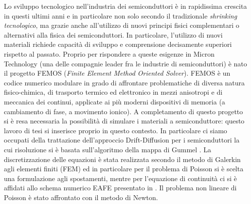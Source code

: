 %
%
%
%
%

Lo sviluppo tecnologico nell'industria dei semiconduttori \`e in rapidissima crescita in questi ultimi anni e in particolare non solo secondo il tradizionale \textit{shrinking tecnologico}, ma grazie anche all'utilizzo di nuovi principi fisici complementari o alternativi alla fisica dei semiconduttori.
In particolare, l'utilizzo di nuovi materiali richiede capacit\`a di sviluppo e comprensione decisamente superiori rispetto al passato. Proprio per rispondere a queste esigenze in Micron Technology (una delle compagnie leader fra le industrie di semiconduttori) \`e nato il progetto FEMOS (\textit{Finite Element Method Oriented Solver}). FEMOS \`e un codice numerico modulare in grado di affrontare problematiche di diversa natura fisico-chimica,  di trasporto termico ed elettronico in mezzi anisotropi e di meccanica dei continui, applicate ai pi\`u moderni dispositivi di memoria (a cambiamento di fase, a movimento ionico).
A completamento di questo progetto si \`e resa necessaria la possibilit\`a di simulare i materiali a semiconduttore: questo lavoro di tesi si inserisce proprio in questo contesto. 
In particolare ci siamo occupati della trattazione dell'approccio Drift-Diffusion \cite{Jackson:ElettroClassica} per i semiconduttori la cui risoluzione si \`e basata sull'algoritmo della mappa di Gummel \cite{GummelMap}. La discretizzazione delle equazioni \`e stata realizzata secondo il metodo di Galerkin agli elementi finiti (FEM) ed in particolare per il problema di Poisson si \`e scelta una formulazione agli spostamenti, mentre per l'equazione di continuit\`a ci si \`e affidati allo schema numerico EAFE presentato in \cite{Zikatanov:EAFE1}. Il problema non lineare di Poisson \`e stato affrontato con il metodo di Newton. 

